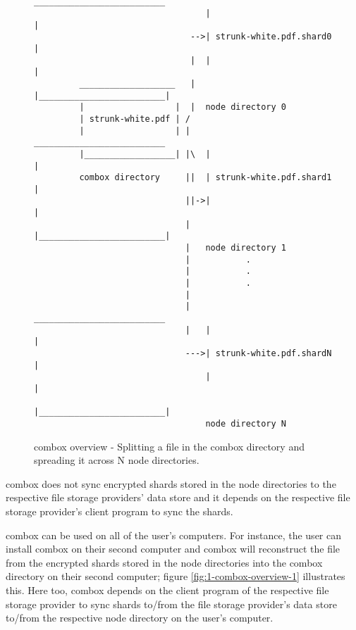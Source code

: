 \begin{figure}[h]
\begin{verbatim}

                                  __________________________
                                  |                         |
                               -->| strunk-white.pdf.shard0 |
                               |  |                         |
         ___________________   |  |_________________________|
         |                  |  |  node directory 0
         | strunk-white.pdf | /
         |                  | |   __________________________
         |__________________| |\  |                         |
         combox directory     ||  | strunk-white.pdf.shard1 |
                              ||->|                         |
                              |   |_________________________|
                              |   node directory 1
                              |           .
                              |           .
                              |           .
                              |
                              |   __________________________
                              |   |                         |
                              --->| strunk-white.pdf.shardN |
                                  |                         |
                                  |_________________________|
                                  node directory N
\end{verbatim}
  \caption{combox overview - Splitting a file in the combox directory
    and spreading it across N node directories.}
\label{fig:1-combox-overview-0}
\end{figure}

combox does not sync encrypted shards stored in the node directories
to the respective file storage providers' data store and it depends on
the respective file storage provider's client program to sync the
shards.

combox can be used on all of the user's computers. For instance, the
user can install combox on their second computer and combox will
reconstruct the file from the encrypted shards stored in the node
directories into the combox directory on their second computer; figure
\ref{fig:1-combox-overview-1} illustrates this. Here too, combox
depends on the client program of the respective file storage provider
to sync shards to/from the file storage provider's data store to/from
the respective node directory on the user's computer.

